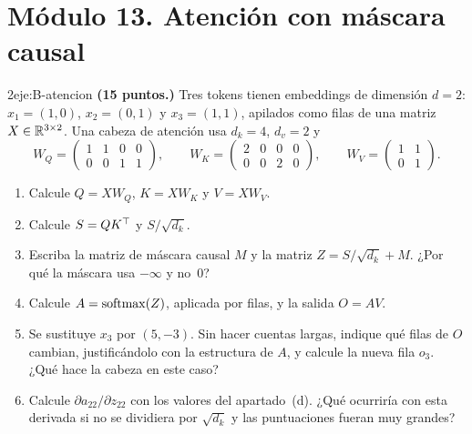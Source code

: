 \section*{Módulo 13. Atención con máscara causal}

\begin{ejercicio}{2}{eje:B-atencion}
\textbf{(15 puntos.)} Tres tokens tienen embeddings de dimensión $d=2$: $x_1=(1,0)$, $x_2=(0,1)$ y $x_3=(1,1)$, apilados como filas de una matriz $X\in\mathbb{R}^{3\times 2}$. Una cabeza de atención usa $d_k=4$, $d_v=2$ y
\[
W_Q=\begin{pmatrix}1&1&0&0\\0&0&1&1\end{pmatrix},\qquad
W_K=\begin{pmatrix}2&0&0&0\\0&0&2&0\end{pmatrix},\qquad
W_V=\begin{pmatrix}1&1\\0&1\end{pmatrix}.
\]
\begin{enumerate}[label=(\alph*)]
  \item {} Calcule $Q=XW_Q$, $K=XW_K$ y $V=XW_V$.
  \item {} Calcule $S=QK^{\top}$ y $S/\sqrt{d_k}$.
  \item {} Escriba la matriz de máscara causal $M$ y la matriz $Z=S/\sqrt{d_k}+M$. ¿Por qué la máscara usa $-\infty$ y no~$0$?
  \item {} Calcule $A=\operatorname{softmax}(Z)$, aplicada por filas, y la salida $O=AV$.
  \item {} Se sustituye $x_3$ por $(5,-3)$. Sin hacer cuentas largas, indique qué filas de $O$ cambian, justificándolo con la estructura de $A$, y calcule la nueva fila $o_3$. ¿Qué hace la cabeza en este caso?
  \item {} Calcule $\partial a_{22}/\partial z_{22}$ con los valores del apartado~(d). ¿Qué ocurriría con esta derivada si no se dividiera por $\sqrt{d_k}$ y las puntuaciones fueran muy grandes?
\end{enumerate}
\end{ejercicio}

